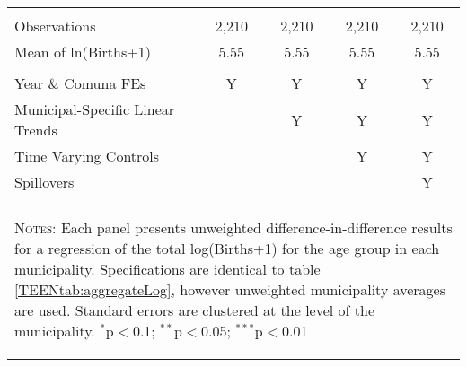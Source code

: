 \begin{table}[!htbp]
\begin{tabular}{@{\extracolsep{5pt}}lcccc}
 & & & & \\
Observations&2,210&2,210&2,210&2,210\\
Mean of ln(Births+1)&5.55&5.55&5.55&5.55\\
\hline \\[-1.8ex] 
{\small Year \& Comuna FEs}             &Y&Y&Y&Y \\
{\small Municipal-Specific Linear Trends}& &Y&Y&Y \\
{\small Time Varying Controls}           & & &Y&Y \\
{\small Spillovers}                      & & & &Y \\
\hline \hline \\[-1.8ex]
\multicolumn{5}{p{13.6cm}}{\begin{footnotesize}
\textsc{Notes:} Each panel presents unweighted       
difference-in-difference results for a regression of  
the total log(Births+1) for the age group in each     
 municipality. Specifications are identical to table  
\ref{TEENtab:aggregateLog}, however unweighted       
municipality averages are used. Standard errors are   
clustered at the level of the municipality.
$^{*}$p$<$0.1; $^{**}$p$<$0.05; $^{***}$p$<$0.01\end{footnotesize}}
\normalsize\end{tabular}\end{table}
